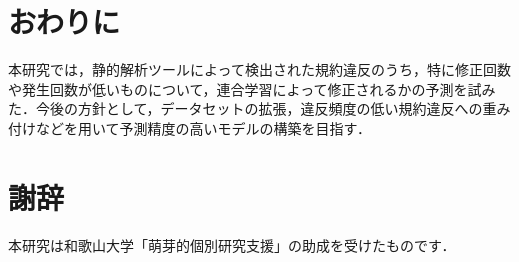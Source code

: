 \documentclass[uplatex,dvipdfmx,a4paper,twocolumn,base=11pt,jbase=11pt,ja=standard]{bxjsarticle}  %
\newcommand{\todo}[1]{\colorbox{yellow}{{\bf TODO}:}{\color{red} {\textbf{[#1]}}}}
\begin{document}

%
%






\section{おわりに}

本研究では，静的解析ツールによって検出された規約違反のうち，特に修正回数や発生回数が低いものについて，連合学習によって修正されるかの予測を試みた．今後の方針として，データセットの拡張，違反頻度の低い規約違反への重み付けなどを用いて予測精度の高いモデルの構築を目指す．






\section*{謝辞}
本研究は和歌山大学「萌芽的個別研究支援」の助成を受けたものです．
\end{document}
